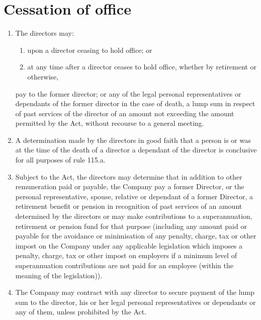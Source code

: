 \section{Cessation of office}

\begin{enumerate}[label=(\alph*)]
    \item The directors may:
    \begin{enumerate}[label=(\roman*)]
        \item upon a director ceasing to hold office; or
        \item at any time after a director ceases to hold office, whether by retirement or otherwise,
    \end{enumerate}
    
    pay to the former director; or any of the legal personal representatives or dependants of the former director in the case of death, a lump sum in respect of past services of the director of an amount not exceeding the amount permitted by the Act, without recourse to a general meeting.
    
    \item A determination made by the directors in good faith that a person is or was at the time of the death of a director a dependant of the director is conclusive for all purposes of rule 115.a.
    
    \item Subject to the Act, the directors may determine that in addition to other remuneration paid or payable, the Company pay a former Director, or the personal representative, spouse, relative or dependant of a former Director, a retirement benefit or pension in recognition of past services of an amount determined by the directors or may make contributions to a superannuation, retirement or pension fund for that purpose (including any amount paid or payable for the avoidance or minimisation of any penalty, charge, tax or other impost on the Company under any applicable legislation which imposes a penalty, charge, tax or other impost on employers if a minimum level of superannuation contributions are not paid for an employee (within the meaning of the legislation)).
    
    \item The Company may contract with any director to secure payment of the lump sum to the director, his or her legal personal representatives or dependants or any of them, unless prohibited by the Act.
\end{enumerate} 